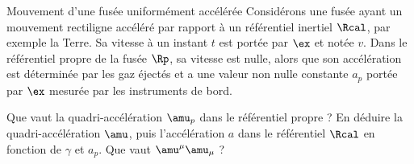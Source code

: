 \begin{exo}[PC][2][TD]{Mouvement d’une fusée uniformément accélérée}
  Considérons une fusée ayant un mouvement rectiligne accéléré par rapport à un référentiel inertiel $\Rcal$, par exemple la Terre. Sa vitesse à un instant $t$ est portée par $\ex$ et notée $v$. Dans le référentiel propre de la fusée $\Rp$, sa vitesse est nulle, alors que son accélération est déterminée par les gaz éjectés et a une valeur non nulle constante $a_p$ portée par $\ex$ mesurée par les instruments de bord.

  \begin{quest}
    \item	Que vaut la quadri-accélération $\amu_p$ dans le référentiel propre ? En déduire la quadri-accélération $\amu$, puis l'accélération $a$ dans le référentiel $\Rcal$ en fonction de $\gamma$ et $a_p$. Que vaut $\amu^\mu \amu_\mu$ ?
    

\end{quest}
\end{exo}
